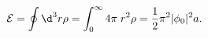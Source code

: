 \begin{equation}
{\mathcal E} = \oint \d^3 r \rho 
= \int_0^\infty 4\pi\; r^2 \rho = {1\over2} \pi^2 |\phi_0|^2 a.
\end{equation}

